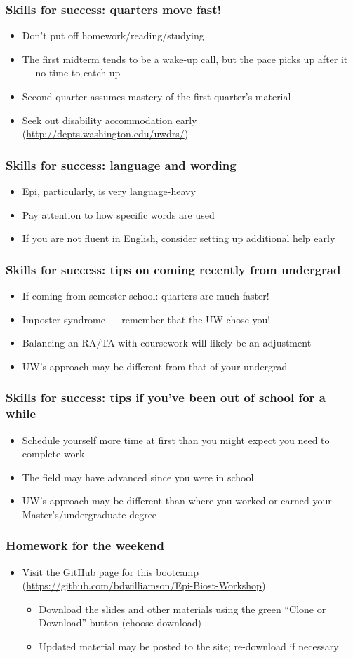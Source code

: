 \documentclass[12pt]{beamer}
\newcommand{\myframe}[1]{\begin{frame} \frametitle{#1}}
\newenvironment{spaceitemize}
{ \begin{itemize}
    \setlength{\itemsep}{10pt}
    \setlength{\parskip}{0pt}
    \setlength{\parsep}{0pt}     }
{ \end{itemize}                  }
\begin{document}
\myframe{Skills for success: quarters move fast!}
\begin{spaceitemize}
\item Don't put off homework/reading/studying
\item The first midterm tends to be a wake-up call, but the pace picks up after it --- no time to catch up
\item Second quarter assumes mastery of the first quarter's material
\item Seek out disability accommodation early (\url{http://depts.washington.edu/uwdrs/})
\end{spaceitemize}
\end{frame}

\myframe{Skills for success: language and wording}
\begin{spaceitemize}
\item Epi, particularly, is very language-heavy
\item Pay attention to how specific words are used
\item If you are not fluent in English, consider setting up additional help early
\end{spaceitemize}
\end{frame}

\myframe{Skills for success: tips on coming recently from undergrad}
\begin{spaceitemize}
\item If coming from semester school: quarters are much faster!
\item Imposter syndrome --- remember that the UW chose you!
\item Balancing an RA/TA with coursework will likely be an adjustment
\item UW's approach may be different from that of your undergrad
\end{spaceitemize}
\end{frame}

\myframe{Skills for success: tips if you've been out of school for a while}
\begin{spaceitemize}
\item Schedule yourself more time at first than you might expect you need to complete work
\item The field may have advanced since you were in school
\item UW's approach may be different than where you worked or earned your Master's/undergraduate degree
\end{spaceitemize}
\end{frame}

\myframe{Homework for the weekend}
\begin{spaceitemize}
\item Visit the GitHub page for this bootcamp (\url{https://github.com/bdwilliamson/Epi-Biost-Workshop})
\begin{spaceitemize}
\item Download the slides and other materials using the green ``Clone or Download'' button (choose download)
\item Updated material may be posted to the site; re-download if necessary
\end{spaceitemize}
\end{spaceitemize}
\end{frame}
\end{document}
